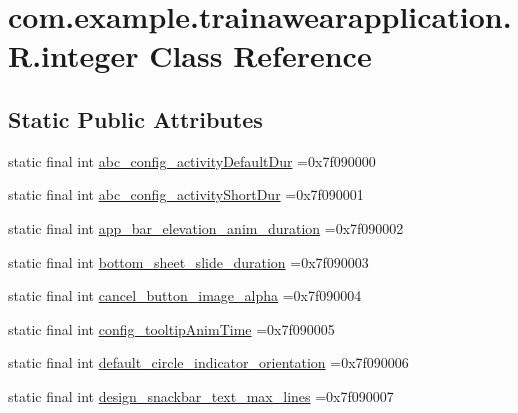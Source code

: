 \hypertarget{classcom_1_1example_1_1trainawearapplication_1_1_r_1_1integer}{}\section{com.\+example.\+trainawearapplication.\+R.\+integer Class Reference}
\label{classcom_1_1example_1_1trainawearapplication_1_1_r_1_1integer}
\subsection*{Static Public Attributes}
\begin{DoxyCompactItemize}
\item 
static final int \mbox{\hyperlink{classcom_1_1example_1_1trainawearapplication_1_1_r_1_1integer_abdf85258af27317fb88ff2a9f0e3d9ce}{abc\+\_\+config\+\_\+activity\+Default\+Dur}} =0x7f090000
\item 
static final int \mbox{\hyperlink{classcom_1_1example_1_1trainawearapplication_1_1_r_1_1integer_a305e6a28be62e9a6de7c17239aedc1ce}{abc\+\_\+config\+\_\+activity\+Short\+Dur}} =0x7f090001
\item 
static final int \mbox{\hyperlink{classcom_1_1example_1_1trainawearapplication_1_1_r_1_1integer_af2a4c1ccd7af54b756895cb5dc16dc39}{app\+\_\+bar\+\_\+elevation\+\_\+anim\+\_\+duration}} =0x7f090002
\item 
static final int \mbox{\hyperlink{classcom_1_1example_1_1trainawearapplication_1_1_r_1_1integer_afeaef8abc08a3a26ad2c7488e135b0d6}{bottom\+\_\+sheet\+\_\+slide\+\_\+duration}} =0x7f090003
\item 
static final int \mbox{\hyperlink{classcom_1_1example_1_1trainawearapplication_1_1_r_1_1integer_a494f3120b0756ea06d1b86d635d51afc}{cancel\+\_\+button\+\_\+image\+\_\+alpha}} =0x7f090004
\item 
static final int \mbox{\hyperlink{classcom_1_1example_1_1trainawearapplication_1_1_r_1_1integer_a95cd9a7dcdb396280d9aa521e25e558c}{config\+\_\+tooltip\+Anim\+Time}} =0x7f090005
\item 
static final int \mbox{\hyperlink{classcom_1_1example_1_1trainawearapplication_1_1_r_1_1integer_a526f1e0265a80acceb564d41aa737a0c}{default\+\_\+circle\+\_\+indicator\+\_\+orientation}} =0x7f090006
\item 
static final int \mbox{\hyperlink{classcom_1_1example_1_1trainawearapplication_1_1_r_1_1integer_abe11b9c3c13e69ac92c3e22b85abcc2b}{design\+\_\+snackbar\+\_\+text\+\_\+max\+\_\+lines}} =0x7f090007

\end{DoxyCompactItemize}
